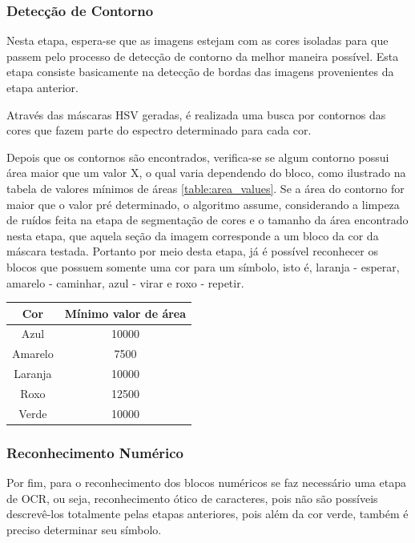     \subsubsection{Detecção de Contorno}
    Nesta etapa, espera-se que as imagens estejam com as cores isoladas para que passem pelo processo de detecção de contorno da melhor maneira possível. Esta etapa consiste basicamente na detecção de bordas das imagens provenientes da etapa anterior.

    Através das máscaras HSV geradas, é realizada uma busca por contornos das cores que fazem parte do espectro determinado para cada cor.
    
    Depois que os contornos são encontrados, verifica-se se algum contorno possui área maior que um valor X, o qual varia dependendo do bloco, como ilustrado na tabela de valores mínimos de áreas \ref{table:area_values}. Se a área do contorno for maior que o valor pré determinado, o algoritmo assume, considerando a limpeza de ruídos feita na etapa de segmentação de cores e o tamanho da área encontrado nesta etapa, que aquela seção da imagem corresponde a um bloco da cor da máscara testada. Portanto por meio desta etapa, já é possível reconhecer os blocos que possuem somente uma cor para um símbolo, isto é, laranja - esperar, amarelo - caminhar, azul - virar e roxo - repetir.
    
    
    \begin{center}
    \begin{tabular}{ |c|c| } 
     \hline
    Cor     & Mínimo valor de área \\
     \hline
    Azul    & 10000                \\
     \hline
    Amarelo & 7500                 \\
     \hline
    Laranja & 10000                \\
     \hline
    Roxo    & 12500                \\
     \hline
    Verde   & 10000                \\    [0.5ex]    
     \hline
    
    \end{tabular}
    \label{table:area_values}
    \end{center}
        
    \subsubsection{Reconhecimento Numérico}
    Por fim, para o reconhecimento dos blocos numéricos se faz necessário uma etapa de OCR, ou seja, reconhecimento ótico de caracteres, pois não são possíveis descrevê-los totalmente pelas etapas anteriores, pois além da cor verde, também é preciso determinar seu símbolo.
    
